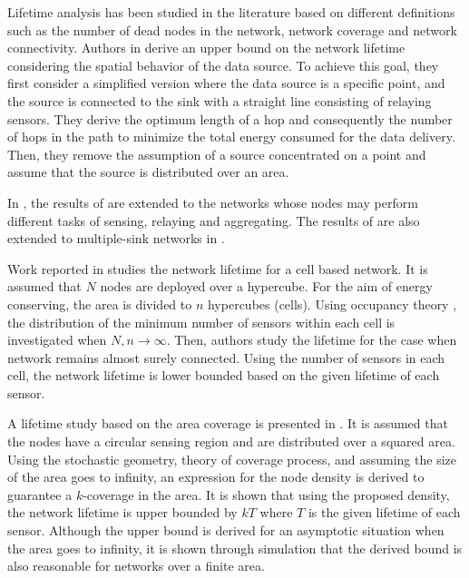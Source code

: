 \documentclass[conference]{IEEEtran}
\begin{document}
Lifetime analysis has been studied in the literature based on
different definitions such as the number of dead nodes in the
network, network coverage and network
connectivity\cite{Chandr_Upperbound_ICC,Chandr_Upperbound_Role_Infocom,
Azad_Multipe_Globecom,Santi_Lifetime_cellbased,
Hou_Alpha_lifetime,Rai_Lifetime_Modeling_DATE}. Authors in
\cite{Chandr_Upperbound_ICC} derive an upper bound on the network
lifetime considering the spatial behavior of the data source. To
achieve this goal, they first consider a simplified version where
the data source is a specific point, and the source is connected to
the sink with a straight line consisting of relaying sensors. They
derive the optimum length of a hop and consequently the number of
hops in the path to minimize the total energy consumed for the data
delivery. Then, they remove the assumption of a source concentrated
on a point and assume that the source is distributed over an area.

In \cite{Chandr_Upperbound_Role_Infocom}, the results of
\cite{Chandr_Upperbound_ICC} are extended to the networks whose
nodes may perform different tasks of sensing, relaying and
aggregating. The results of \cite{Chandr_Upperbound_ICC} are also
extended to multiple-sink networks in \cite{Azad_Multipe_Globecom}.

Work reported in \cite{Santi_Lifetime_cellbased} studies the network
lifetime for a cell based network. It is assumed that $N$ nodes are
deployed over a hypercube. For the aim of energy conserving, the
area is divided to $n$ hypercubes (cells). Using occupancy theory
\cite{Kolchin_Random_allocation}, the distribution of the minimum
number of sensors within each cell is investigated when
$N,n\rightarrow \infty$. Then, authors study the lifetime for the
case when network remains almost surely connected. Using the number
of sensors in each cell, the network lifetime is lower bounded based
on the given lifetime of each sensor.

A lifetime study based on the area coverage is presented in
\cite{Hou_Alpha_lifetime}. It is assumed that the nodes have a
circular sensing region and are distributed over a squared area.
Using the stochastic geometry, theory of coverage process, and
assuming the size of the area goes to infinity, an expression for
the node density is derived to guarantee a $k$-coverage in the area.
It is shown that using the proposed density, the network lifetime is
upper bounded by $kT$ where $T$ is the given lifetime of each
sensor. Although the upper bound is derived for an asymptotic
situation when the area goes to infinity, it is shown through
simulation that the derived bound is also reasonable for networks
over a finite area.
\end{document}
